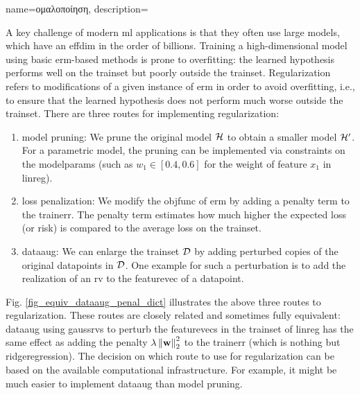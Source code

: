 {name={\foreignlanguage{greek}{ομαλοποίηση}}, 
	description={A key challenge of modern \gls{ml} applications is that they often 
		use large \gls{model}s, which have an \gls{effdim} in the order of billions. 
		Training a high-dimensional \gls{model} using basic \gls{erm}-based methods
		is prone to \gls{overfitting}: the learned \gls{hypothesis} performs well on the \gls{trainset} 
		but poorly outside the \gls{trainset}. Regularization refers to modifications of a given instance 
		of \gls{erm} in order to avoid \gls{overfitting}, i.e., to ensure that the learned \gls{hypothesis} does 
		not perform much worse outside the \gls{trainset}. There are three routes for implementing 
		regularization: 
		\begin{enumerate}[label=\arabic*)]
			\item {\Gls{model} pruning:} We prune the original \gls{model} $\mathcal{H}$ to obtain a 
			smaller \gls{model} $\mathcal{H}'$. For a parametric \gls{model}, the pruning can be 
			implemented via constraints on the \glspl{modelparam} (such as $w_{1} \in [0.4,0.6]$ for 
			the weight of \gls{feature} $x_{1}$ in \gls{linreg}).
			\item {\Gls{loss} penalization:} We modify the \gls{objfunc} of \gls{erm} by adding a 
			penalty term to the \gls{trainerr}. The penalty term estimates how much higher the expected \gls{loss} (or \gls{risk}) 
			is compared to the average \gls{loss} on the \gls{trainset}. 
			\item {\Gls{dataaug}:} We can enlarge the \gls{trainset} $\mathcal{D}$ by adding 
			perturbed copies of the original \gls{datapoint}s in $\mathcal{D}$. One example for such 
			a perturbation is to add the \gls{realization} of an \gls{rv} to the \gls{featurevec} 
			of a \gls{datapoint}. 
		\end{enumerate} 
		Fig. \ref{fig_equiv_dataaug_penal_dict} illustrates the above three routes to regularization. 
		These routes are closely related and sometimes fully equivalent: \gls{dataaug} using \gls{gaussrv}s 
		to perturb the \gls{featurevec}s in the \gls{trainset} of \gls{linreg} 
		has the same effect as adding the penalty 
		$\lambda \left\Vert {{\bf w}} \right\Vert_{2}^2$ to the \gls{trainerr} (which is nothing but \gls{ridgeregression}). 
        		The decision on which route to use for regularization can be based on the 
        		available computational infrastructure. For example, it might be much easier to 
       	 	implement \gls{dataaug} than \gls{model} pruning. 
}}
